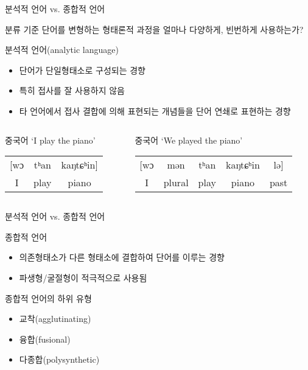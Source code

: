 \documentclass[11pt, aspectratio=169]{beamer}
\newcommand{\textds}[1]{{\ipafont #1}}
\begin{document}
\begin{frame}[t]{분석적 언어 vs. 종합적 언어}
  \begin{block}{분류 기준}
    단어를 변형하는 형태론적 과정을 얼마나 다양하게, 빈번하게 사용하는가?
  \end{block}
  \begin{block}{분석적 언어(analytic language)}
    \begin{itemize}
      \item 단어가 단일형태소로 구성되는 경향
      \item 특히 접사를 잘 사용하지 않음
      \item 타 언어에서 접사 결합에 의해 표현되는 개념들을 단어 연쇄로 표현하는 경향
    \end{itemize}
  \end{block}
  \begin{columns}
    \begin{column}{0.46\textwidth}
      중국어 ‘I play the piano’ \\
      \begin{tabular}{ccc}
        \textds{[wɔ} &	\textds{tʰan} & \textds{kaŋtɕʰin]} \\
        I & play & piano \\
      \end{tabular}      
    \end{column}
    \begin{column}{0.47\textwidth}
      중국어 ‘We played the piano’ \\
      \begin{tabular}{ccccc}
        \textds{[wɔ} &	\textds{mən} &	\textds{tʰan} & \textds{kaŋtɕʰin} & \textds{lə]} \\
        I	& plural	& play	& piano	& past \\
      \end{tabular}            
    \end{column}
  \end{columns}
\end{frame}

\begin{frame}[t]{분석적 언어 vs. 종합적 언어}
  \begin{block}{종합적 언어}
    \begin{itemize}
      \item 의존형태소가 다른 형태소에 결합하여 단어를 이루는 경향
      \item 파생형/굴절형이 적극적으로 사용됨
    \end{itemize}
  \end{block}
  종합적 언어의 하위 유형
  \begin{itemize}
    \item 교착(agglutinating)
    \item 융합(fusional)
    \item 다종합(polysynthetic)
  \end{itemize}
\end{frame}
\end{document}

